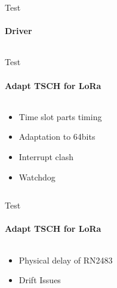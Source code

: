 \begin{frame}{Test}
\framesubtitle{Driver}

\begin{columns}
\begin{column}{0.5\textwidth}

\end{column}
\begin{column}{0.5\textwidth}

\end{column}
\end{columns}

\end{frame}

\begin{frame}{Test}
\framesubtitle{Adapt TSCH for LoRa}
\begin{columns}
\begin{column}{0.5\textwidth}
\begin{itemize}
    \item Time slot parts timing 
    \item Adaptation to 64bits
    \item Interrupt clash
    \item Watchdog
\end{itemize}
\end{column}
\begin{column}{0.5\textwidth}
\end{column}
\end{columns}
\end{frame}

\begin{frame}{Test}
\framesubtitle{Adapt TSCH for LoRa}
\begin{columns}
\begin{column}{0.5\textwidth}
\begin{itemize}
    \item Physical delay of RN2483
    \item Drift Issues
\end{itemize}
\end{column}
\begin{column}{0.5\textwidth}
\end{column}
\end{columns}
\end{frame}


